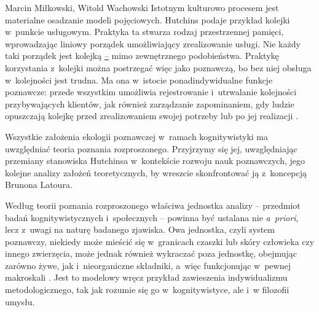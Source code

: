 \begin{artplenv2auth}{Marcin Miłkowski, Witold Wachowski}
Istotnym kulturowo procesem jest materialne osadzanie modeli pojęciowych. Hutchins podaje przykład kolejki w~punkcie usługowym. Praktyka ta stwarza rodzaj przestrzennej pamięci, wprowadzając liniowy porządek umożliwiający zrealizowanie usługi. Nie każdy taki porządek jest kolejką \href{https://www.zotero.org/google-docs/?MOG7xK}{–} mimo zewnętrznego podobieństwa. Praktykę korzystania z~kolejki można postrzegać więc jako poznawczą, bo bez niej obsługa w~kolejności jest trudna. Ma ona w~istocie ponadindywidualne funkcje poznawcze: przede wszystkim umożliwia rejestrowanie i~utrwalanie kolejności przybywających klientów, jak również zarządzanie zapominaniem, gdy ludzie opuszczają kolejkę przed zrealizowaniem swojej potrzeby lub po jej realizacji
\parencites[][s.~1559–1560]{hutchins_material_2005}[][s.~39–40]{hutchins_cultural_2014}.%


Wszystkie założenia ekologii poznawczej w~ramach kognitywistyki ma uwzględniać teoria poznania rozproszonego. Przyjrzymy się jej, uwzględniając przemiany stanowiska Hutchinsa w~kontekście rozwoju nauk poznawczych, jego kolejne analizy założeń teoretycznych, by wreszcie skonfrontować ją z~koncepcją Brunona Latoura.

Według teorii poznania rozproszonego właściwa jednostka analizy -- przedmiot badań kognitywistycznych i~społecznych -- powinna być ustalana nie \textit{a~priori}, lecz z~uwagi na naturę badanego zjawiska. Owa jednostka, czyli system poznawczy, niekiedy może mieścić się w~granicach czaszki lub skóry człowieka czy innego zwierzęcia, może jednak również wykraczać poza jednostkę, obejmując zarówno żywe, jak i~nieorganiczne składniki, a~więc funkcjonując w~pewnej makroskali
\parencites[][s.~128–129]{hutchins_cognition_1995}[][s.~2068]{hutchins_cognition_2001}[][s.~426]{hutchins_enaction_2010}. %
 Jest to modelowy wręcz przykład zawieszenia indywidualizmu metodologicznego, tak jak rozumie się go w~kognitywistyce, ale i~w filozofii umysłu.


\end{artplenv2auth}
